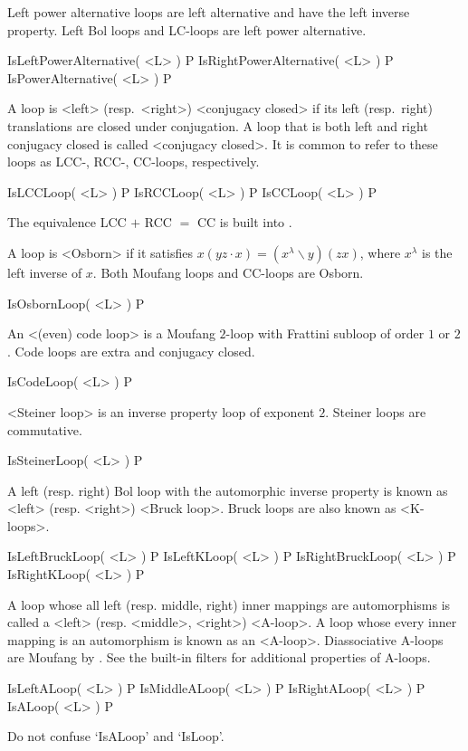 Left power alternative loops are left alternative and have the
left inverse property. Left Bol loops and LC-loops are left power
alternative.

\>IsLeftPowerAlternative( <L> ) P
\>IsRightPowerAlternative( <L> ) P
\>IsPowerAlternative( <L> ) P


\noindent A loop is <left> (resp.\ <right>) <conjugacy closed> if its left (resp.\ right)
translations are closed under conjugation. A loop that is both left and right
conjugacy closed is called <conjugacy closed>. It is common to refer to these loops as
LCC-, RCC-, CC-loops, respectively.

\>IsLCCLoop( <L> ) P
\>IsRCCLoop( <L> ) P
\>IsCCLoop( <L> ) P

The equivalence LCC $+$ RCC $=$ CC is built into {\LOOPS}.

A loop is <Osborn> if it satisfies
$x(yz\cdot x)=(x^\lambda\backslash y)(zx)$, where $x^\lambda$ is the left
inverse of $x$. Both Moufang loops and CC-loops are Osborn.

\>IsOsbornLoop( <L> ) P


An <(even) code loop> is a Moufang $2$-loop
with Frattini subloop of order $1$ or $2$. Code loops are extra and conjugacy
closed.

\>IsCodeLoop( <L> ) P

<Steiner loop> is an inverse property
loop of exponent $2$. Steiner loops are commutative.

\>IsSteinerLoop( <L> ) P

A left (resp. right) Bol loop with the automorphic inverse property is known as
<left> (resp. <right>) <Bruck loop>. Bruck loops are also known as
<K-loops>.

\>IsLeftBruckLoop( <L> ) P
\>IsLeftKLoop( <L> ) P
\>IsRightBruckLoop( <L> ) P
\>IsRightKLoop( <L> ) P

A loop whose all left (resp. middle, right) inner mappings are automorphisms is
called a <left> (resp. <middle>, <right>)
<A-loop>. A loop
whose every inner mapping is an automorphism is known as an
<A-loop>. Diassociative A-loops are Moufang by
\cite{KiKuPh}. See the built-in filters for additional properties of A-loops.


\>IsLeftALoop( <L> ) P
\>IsMiddleALoop( <L> ) P
\>IsRightALoop( <L> ) P
\>IsALoop( <L> ) P

Do not confuse `IsALoop' and `IsLoop'.
